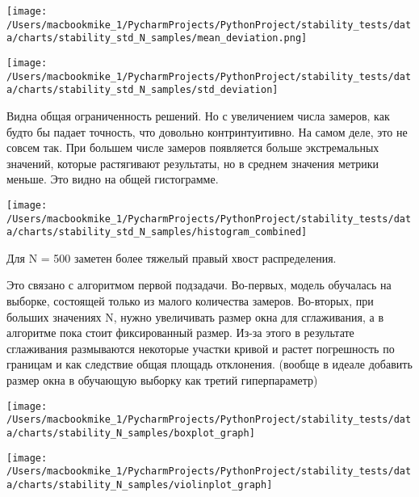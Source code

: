 \documentclass[12pt]{article}
\begin{document}
\begin{center}
    \begin{minipage}{0.48\textwidth}
        \texttt{[image: /Users/macbookmike\_1/PycharmProjects/PythonProject/stability\_tests/data/charts/stability\_std\_N\_samples/mean\_deviation.png]}
    \end{minipage}
    \hfill
    \begin{minipage}{0.48\textwidth}
        \texttt{[image: /Users/macbookmike\_1/PycharmProjects/PythonProject/stability\_tests/data/charts/stability\_std\_N\_samples/std\_deviation]}
    \end{minipage}
\end{center}

Видна общая ограниченность решений. Но с увеличением числа
замеров, как будто бы падает точность, что довольно контринтуитивно. На самом деле, это не совсем так. При большем числе
замеров появляется больше экстремальных значений, которые растягивают результаты, но в среднем значения метрики
меньше. Это видно на общей гистограмме.

\begin{center}
    \texttt{[image: /Users/macbookmike\_1/PycharmProjects/PythonProject/stability\_tests/data/charts/stability\_std\_N\_samples/histogram\_combined]}
\end{center}

Для N = 500 заметен более тяжелый правый хвост распределения.
\vspace{0.5em}

Это связано с алгоритмом
первой подзадачи. Во-первых, модель обучалась на выборке, состоящей только из
малого количества замеров. Во-вторых, при больших значениях N, нужно увеличивать размер окна для
сглаживания, а в алгоритме пока стоит фиксированный размер. Из-за этого в результате сглаживания размываются некоторые участки кривой и растет
погрешность по границам и как следствие общая площадь отклонения. (вообще в
идеале добавить размер окна в обучающую выборку как третий гиперпараметр)


\begin{center}
    \begin{minipage}{0.48\textwidth}
        \texttt{[image: /Users/macbookmike\_1/PycharmProjects/PythonProject/stability\_tests/data/charts/stability\_N\_samples/boxplot\_graph]}
    \end{minipage}
    \hfill
    \begin{minipage}{0.48\textwidth}
        \texttt{[image: /Users/macbookmike\_1/PycharmProjects/PythonProject/stability\_tests/data/charts/stability\_N\_samples/violinplot\_graph]}
    \end{minipage}
\end{center}
\end{document}
